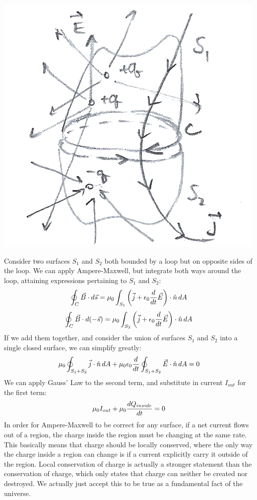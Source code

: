 \begin{center}
	\includegraphics[scale=0.25]{images/em/ampere-surface.png}
\end{center}
Consider two surfaces $S_1$ and $S_2$ both bounded by a loop but on opposite sides of the loop. We can apply Ampere-Maxwell, but integrate both ways around the loop, attaining expressions pertaining to $S_1$ and $S_2$:
\[
	\oint_C \vec B \cdot d\vec s = \mu_0 \int_{S_1} \left(\vec j + \epsilon_0  \frac{d }{d t}\vec E\right) \cdot \hat n \, dA
\]	
\[
	\oint_C \vec B \cdot d(-\vec s) = \mu_0 \int_{S_2} \left(\vec j + \epsilon_0  \frac{d }{d t}\vec E\right) \cdot \hat n \, dA
\]
If we add them together, and consider the union of surfaces $S_1$ and $S_2$ into a single closed surface, we can simplify greatly:
\[
	\mu_0 \oint_{S_1+S_2} \vec j \cdot \hat n \, dA + \mu_0 \epsilon_0 \frac{d }{d t} \oint_{S_1+S_2} \vec E \cdot \hat n \, dA = 0
\]
We can apply Gauss' Law to the second term, and substitute in current $I_{out}$ for the first term:
\[
	\mu_0 I_{out} + \mu_0 \frac{d Q_{inside}}{d t} = 0
\]
In order for Ampere-Maxwell to be correct for any surface, if a net current flows out of a region, the charge inside the region must be changing at the same rate. This basically means that charge should be locally conserved, where the only way the charge inside a region can change is if a current explicitly carry it outside of the region. Local conservation of charge is actually a stronger statement than the conservation of charge, which only states that charge can neither be created nor destroyed. We actually just accept this to be true as a fundamental fact of the universe. \\
